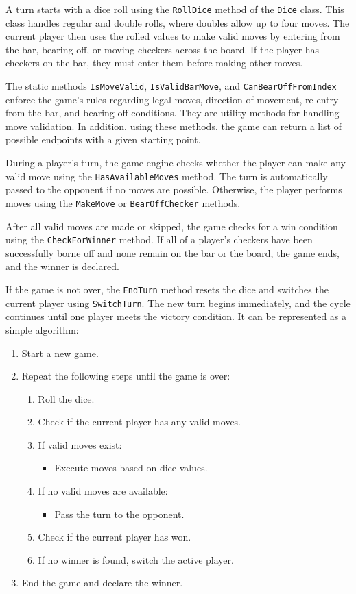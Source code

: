 A turn starts with a dice roll using the \texttt{RollDice} method of the \texttt{Dice} class. This class handles regular and double rolls, where doubles allow up to four moves. The current player then uses the rolled values to make valid moves by entering from the bar, bearing off, or moving checkers across the board. If the player has checkers on the bar, they must enter them before making other moves.

 The static methods \texttt{IsMoveValid}, \texttt{IsValidBarMove}, and \texttt{CanBearOffFromIndex} enforce the game's rules regarding legal moves, direction of movement, re-entry from the bar, and bearing off conditions. They are utility methods for handling move validation. In addition, using these methods, the game can return a list of possible endpoints with a given starting point.

During a player's turn, the game engine checks whether the player can make any valid move using the \texttt{HasAvailableMoves} method. The turn is automatically passed to the opponent if no moves are possible. Otherwise, the player performs moves using the \texttt{MakeMove} or \texttt{BearOffChecker} methods.

After all valid moves are made or skipped, the game checks for a win condition using the \texttt{CheckForWinner} method. If all of a player's checkers have been successfully borne off and none remain on the bar or the board, the game ends, and the winner is declared.

If the game is not over, the \texttt{EndTurn} method resets the dice and switches the current player using \texttt{SwitchTurn}. The new turn begins immediately, and the cycle continues until one player meets the victory condition. It can be represented as a simple algorithm:
\begin{enumerate}
    \item Start a new game.
    \item Repeat the following steps until the game is over:
    \begin{enumerate}
        \item Roll the dice.
        \item Check if the current player has any valid moves.
        \item If valid moves exist:
        \begin{itemize}
            \item Execute moves based on dice values.
        \end{itemize}
        \item If no valid moves are available:
        \begin{itemize}
            \item Pass the turn to the opponent.
        \end{itemize}
        \item Check if the current player has won.
        \item If no winner is found, switch the active player.
    \end{enumerate}
    \item End the game and declare the winner.
\end{enumerate}

